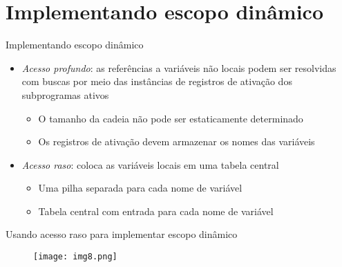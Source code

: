 \documentclass[10pt]{beamer}
\begin{document}
\section{Implementando escopo dinâmico}

\begin{frame}{Implementando escopo dinâmico}
\begin{itemize}
	\item \textit{Acesso profundo}: as referências a variáveis não locais podem ser resolvidas com buscas por meio das instâncias de registros de ativação dos subprogramas ativos
	\begin{itemize}
        \item O tamanho da cadeia não pode ser estaticamente determinado
        \item Os registros de ativação devem armazenar os nomes das variáveis
    \end{itemize}
    \item \textit{Acesso raso}: coloca as variáveis locais em uma tabela central
    \begin{itemize}
        \item Uma pilha separada para cada nome de variável
        \item Tabela central com entrada para cada nome de variável
    \end{itemize}
\end{itemize}

\end{frame}


\begin{frame}{Usando acesso raso para implementar escopo dinâmico}
\begin{figure}
          \texttt{[image: img8.png]}
        \end{figure}


\end{frame}
\end{document}
